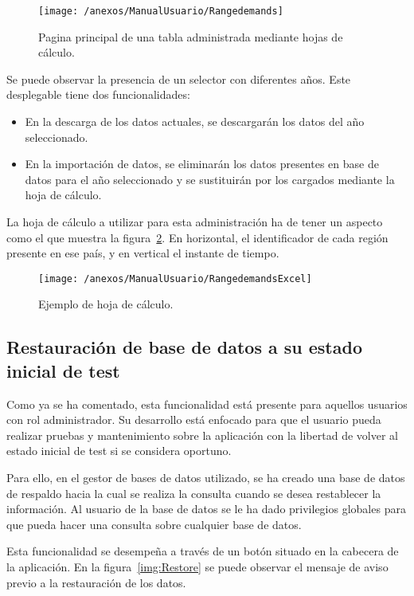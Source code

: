 \begin{figure}[h]
	\centering
	\texttt{[image: /anexos/ManualUsuario/Rangedemands]}
	\caption{Pagina principal de una tabla administrada mediante hojas de cálculo.}
	\label{img:Rangedemands}
\end{figure}

Se puede observar la presencia de un selector con diferentes años. Este desplegable tiene dos funcionalidades:
\begin{itemize}
	\item En la descarga de los datos actuales, se descargarán los datos del año seleccionado.
	\item En la importación de datos, se eliminarán los datos presentes en base de datos para el año seleccionado y se sustituirán por los cargados mediante la hoja de cálculo.
\end{itemize}

La hoja de cálculo a utilizar para esta administración ha de tener un aspecto como el que muestra la figura~\ref{img:RangedemandsExcel}. En horizontal, el identificador de cada región presente en ese país, y en vertical el instante de tiempo.

\begin{figure}[h]
	\centering
	\texttt{[image: /anexos/ManualUsuario/RangedemandsExcel]}
	\caption{Ejemplo de hoja de cálculo.}
	\label{img:RangedemandsExcel}
\end{figure}

\newpage

\subsection{Restauración de base de datos a su estado inicial de test}

Como ya se ha comentado, esta funcionalidad está presente para aquellos usuarios con rol administrador. Su desarrollo está enfocado para que el usuario pueda realizar pruebas y mantenimiento sobre la aplicación con la libertad de volver al estado inicial de test si se considera oportuno.

Para ello, en el gestor de bases de datos utilizado, se ha creado una base de datos de respaldo hacia la cual se realiza la consulta cuando se desea restablecer la información. Al usuario de la base de datos se le ha dado privilegios globales para que pueda hacer una consulta sobre cualquier base de datos.

Esta funcionalidad se desempeña a través de un botón situado en la cabecera de la aplicación. En la figura~\ref{img:Restore} se puede observar el mensaje de aviso previo a la restauración de los datos.

